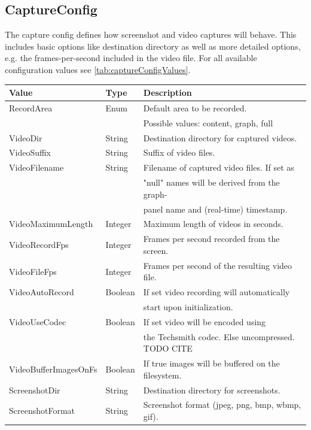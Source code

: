 \subsection{CaptureConfig}
\label{ss:captureConfig}
The capture config defines how screenshot and video captures will behave. This includes basic options like destination directory as well as more detailed options, e.g. the frames-per-second included in the video file. For all available configuration values see \ref{tab:captureConfigValues}.

\begin{table}[h]
\centering
\begin{tabular}[h]{|l|l|l|}\hline
	\textbf{Value} & \textbf{Type} & \textbf{Description}\\
	\hline
	RecordArea & Enum & Default area to be recorded.\\
	& & Possible values: content, graph, full\\
	\hline
	VideoDir & String & Destination directory for captured videos.\\
	\hline
	VideoSuffix & String & Suffix of video files.\\
	\hline
	VideoFilename & String & Filename of captured video files. If set as\\
	& & "null" names will be derived from the graph-\\
	& & panel name and (real-time) timestamp.\\
	\hline
	VideoMaximumLength & Integer & Maximum length of videos in seconds.\\
	\hline
	VideoRecordFps & Integer & Frames per second recorded from the screen.\\
	\hline
	VideoFileFps & Integer & Frames per second of the resulting video file.\\
	\hline
	VideoAutoRecord & Boolean & If set video recording will automatically\\
	& & start upon initialization.\\
	\hline
	VideoUseCodec & Boolean & If set video will be encoded using\\
	& & the Techsmith codec. Else uncompressed. TODO CITE\\
	\hline
	VideoBufferImagesOnFs & Boolean & If true images will be buffered on the filesystem.\\
	\hline
	ScreenshotDir & String & Destination directory for screenshots.\\
	\hline
	ScreenshotFormat & String & Screenshot format (jpeg, png, bmp, wbmp, gif).\\

\end{tabular}
\end{table}
